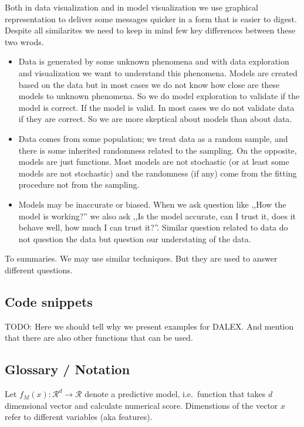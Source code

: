 \documentclass[]{krantz}
\providecommand{\tightlist}{%
  \setlength{\itemsep}{0pt}\setlength{\parskip}{0pt}}
\theoremstyle{definition}
\theoremstyle{definition}
\theoremstyle{definition}
\theoremstyle{remark}
\begin{document}
Both in data visualization and in model visualization we use graphical
representation to deliver some messages quicker in a form that is easier
to digest. Despite all similarites we need to keep in mind few key
differences between these two wrods.

\begin{itemize}
\tightlist
\item
  Data is generated by some unknown phenomena and with data exploration
  and visualization we want to understand this phenomena. Models are
  created based on the data but in most cases we do not know how close
  are these models to unknown phenomena. So we do model exploration to
  validate if the model is correct. If the model is valid. In most cases
  we do not validate data if they are correct. So we are more skeptical
  about models than about data.
\item
  Data comes from some population; we treat data as a random sample, and
  there is some inherited randomness related to the sampling. On the
  opposite, models are just functions. Most models are not stochastic
  (or at least some models are not stochastic) and the randomness (if
  any) come from the fitting procedure not from the sampling.
\item
  Models may be inaccurate or biased. When we ask question like ,,How
  the model is working?'' we also ask ,,Is the model accurate, can I
  trust it, does it behave well, how much I can trust it?''. Similar
  question related to data do not question the data but question our
  understating of the data.
\end{itemize}

To summaries. We may use similar techniques. But they are used to answer
different questions.

\hypertarget{code-snippets}{%
\subsection{Code snippets}\label{code-snippets}}

TODO: Here we should tell why we present examples for DALEX. And mention
that there are also other functions that can be used.

\hypertarget{glossary-notation}{%
\subsection{Glossary / Notation}\label{glossary-notation}}

Let \(f_{M}(x): \mathcal R^{d} \rightarrow \mathcal R\) denote a
predictive model, i.e.~function that takes \(d\) dimensional vector and
calculate numerical score. Dimenstions of the vector \(x\) refer to
different variables (aka features).
\end{document}

